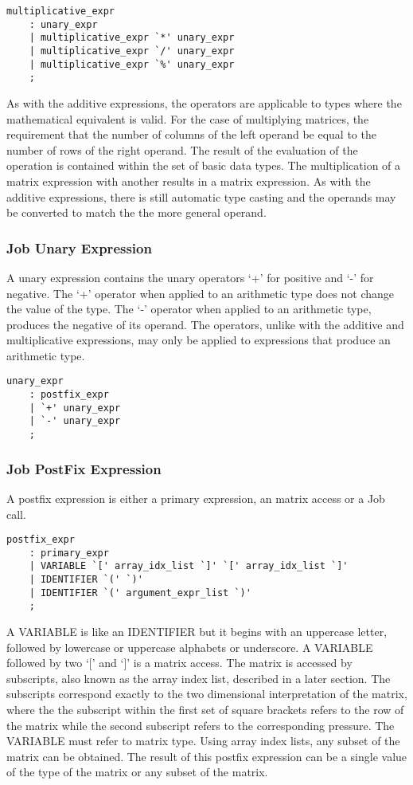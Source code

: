 \documentclass[prodmode,acmtecs]{acmsmall}
\begin{document}
\begin{lstlisting}
multiplicative_expr
	: unary_expr
	| multiplicative_expr `*' unary_expr
	| multiplicative_expr `/' unary_expr
	| multiplicative_expr `%' unary_expr
	;
\end{lstlisting}

As with the additive expressions, the operators are applicable to types
where the mathematical equivalent is valid. For the case of multiplying
matrices, the requirement that the number of columns of the left operand 
be equal to the number of rows of the right operand. The result of the
evaluation of the operation is contained within the set of basic data 
types. The multiplication of a matrix expression with another results in 
a matrix expression. As with the additive expressions, there is still 
automatic type casting and the operands may be converted to match the
the more general operand. 

\subsubsection{Job Unary Expression}
  
A unary expression contains the unary operators `+' for positive and `-' 
for negative. The `+' operator when applied to an arithmetic type does
not change the value of the type. The `-' operator when applied to an
arithmetic type, produces the negative of its operand. The operators, 
unlike with the additive and multiplicative expressions, may only be
applied to expressions that produce an arithmetic type.


\begin{lstlisting}
unary_expr
	: postfix_expr
	| `+' unary_expr
	| `-' unary_expr
	;
\end{lstlisting}

\subsubsection{Job PostFix Expression}

A postfix expression is either a primary expression, an matrix access or 
a Job call.

\begin{lstlisting}
postfix_expr
	: primary_expr
	| VARIABLE `[' array_idx_list `]' `[' array_idx_list `]'
	| IDENTIFIER `(' `)'
	| IDENTIFIER `(' argument_expr_list `)'
	;
\end{lstlisting}

A VARIABLE is like an IDENTIFIER but it begins with an uppercase letter,
followed by lowercase or uppercase alphabets or underscore. A VARIABLE
followed by two `[' and `]' is a matrix access. The matrix is accessed
by subscripts, also known as the array index list, described in a later
section. The subscripts correspond exactly to the two dimensional 
interpretation of the matrix, where the the subscript within the first 
set of square brackets refers to the row of the matrix while the second
subscript refers to the corresponding pressure. The VARIABLE must refer 
to matrix type. Using array index lists, any subset of the matrix can be
obtained. The result of this postfix expression can be a single value of
the type of the matrix or any subset of the matrix.
\end{document}
